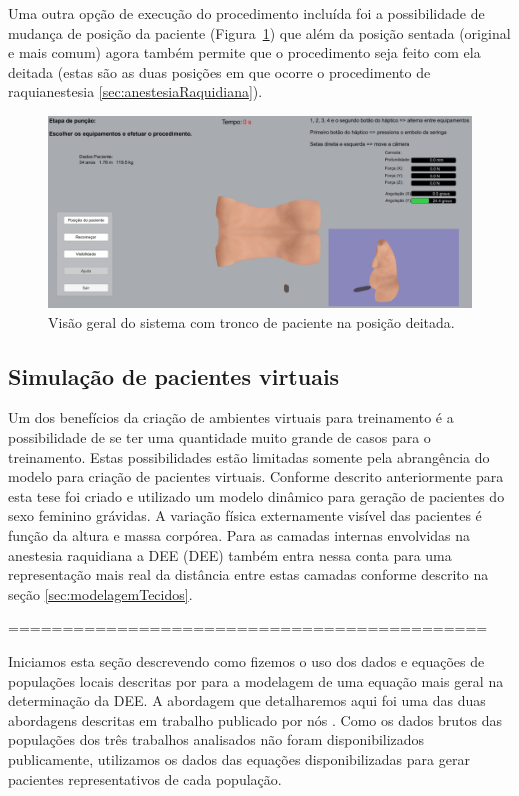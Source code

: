 Uma outra opção de execução do procedimento incluída foi a possibilidade de mudança de posição da paciente (Figura~\ref{fig:posicaoDeitada}) que além da posição sentada (original e mais comum) agora também permite que o procedimento seja feito com ela deitada (estas são as duas posições em que ocorre o procedimento de raquianestesia \ref{sec:anestesiaRaquidiana}).

\begin{figure}[ht!]
    \centering
    \includegraphics[width=0.9\linewidth]{capitulos/figuras/sistema posicao deitada.png} 
    \caption{Visão geral do sistema com tronco de paciente na posição deitada.}
    \label{fig:posicaoDeitada}
\end{figure}

\subsection {Simulação de pacientes virtuais} 
\label{sec:SimulacaoPacientesVirtuais}

Um dos benefícios da criação de ambientes virtuais para treinamento é a possibilidade de se ter uma quantidade muito grande de casos para o treinamento. Estas possibilidades estão limitadas somente pela abrangência do modelo para criação de pacientes virtuais. Conforme descrito anteriormente para esta tese foi criado e utilizado um modelo dinâmico para geração de pacientes do sexo feminino grávidas. A variação física externamente visível das pacientes é função da altura e massa corpórea. Para as camadas internas envolvidas na anestesia raquidiana a \acrlong{DEE} (\acrshort{DEE}) também entra nessa conta para uma representação mais real da distância entre estas camadas conforme descrito na seção \ref{sec:modelagemTecidos}. 

============================================

Iniciamos esta seção descrevendo como fizemos o uso dos dados e equações de populações locais descritas por \textcite{Clinkscales2007, Sharma2011, Hazarika2016} para a modelagem de uma equação mais geral na determinação da \acrshort{DEE}. A abordagem que detalharemos aqui foi uma das duas abordagens descritas em trabalho publicado por nós \cite{Melo2020}.
Como os dados brutos das populações dos três trabalhos analisados não foram disponibilizados publicamente, utilizamos os dados das equações disponibilizadas para gerar pacientes representativos de cada população.

